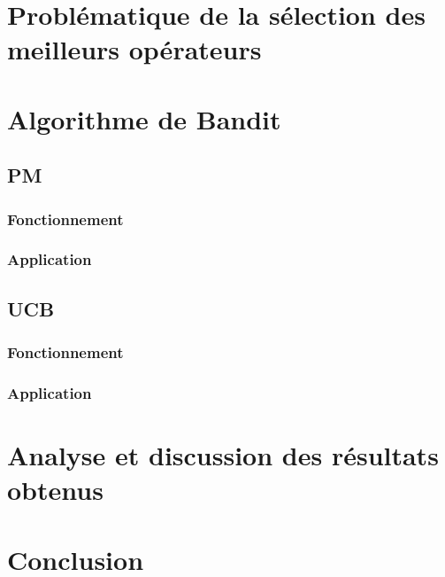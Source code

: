 \documentclass[12pt]{article}
\begin{document}
\section{Problématique de la sélection des meilleurs opérateurs}
\section{Algorithme de Bandit}
	\subsection{PM}
		\subsubsection{Fonctionnement}
		\subsubsection{Application}
	\subsection{UCB}
		\subsubsection{Fonctionnement}
		\subsubsection{Application}

\section{Analyse et discussion des résultats obtenus}
\section{Conclusion}
\end{document}
